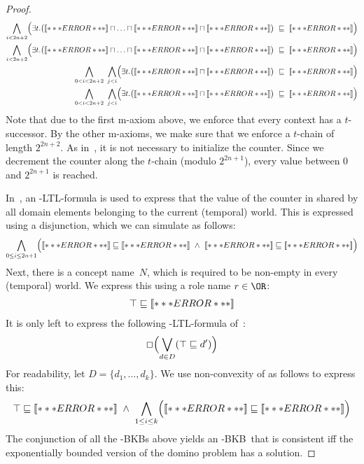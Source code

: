 \begin{proof}
  \begin{align*}
    \bigwedge_{i<2n+2} \Bigl( \exists t.\bigl(\oax{Z_{0}(a)} \sqcap\ldots\sqcap \oax{Z_{i-1}(a)} \sqcap \oax{Z_{i}(a)}\bigr)
    & \ \sqsubseteq\ \oax{(\lnot Z_{i})(a)}\Bigr)\\ 
    \bigwedge_{i<2n+2}\Bigl( \exists t.\bigl(\oax{Z_{0}(a)}\sqcap\ldots\sqcap \oax{Z_{i-1}(a)} \sqcap \oax{(\lnot Z_{i})(a)}\bigr)
    & \ \sqsubseteq\ \oax{Z_{i}(a)}\Bigr)\\
    \bigwedge_{0<i<2n+2}\ \bigwedge_{j<i}\Bigl(\exists t.\bigl(\oax{(\lnot Z_{j})(a)}\sqcap\oax{Z_{i}(a)}\bigr)
    & \ \sqsubseteq\ \oax{Z_{i}(a)}\Bigr)\\
    \bigwedge_{0<i<2n+2}\ \bigwedge_{j<i}\Bigl(\exists t.\bigl(\oax{(\lnot Z_{j})(a)}\sqcap\oax{(\lnot Z_{i})(a)}\bigr)
    & \ \sqsubseteq\ \oax{(\lnot Z_{i})(a)}\Bigr)
  \end{align*}
  Note that due to the first m-axiom above, we enforce that every context has a $t$-successor.  By
  the other m-axioms, we make sure that we enforce a $t$-chain of length $2^{2n+2}$.
  As in~\cite{BaGL-KR08,BaGL-ToCL12}, it is not necessary to initialize the counter.  Since we
  decrement the counter along the $t$-chain (modulo $2^{2n+1}$), every value between $0$ and
  $2^{2n+1}$ is reached.

  In~\cite{BaGL-KR08,BaGL-ToCL12}, an \ALC-LTL-formula is used to express that the value of the
  counter in shared by all domain elements belonging to the current (temporal) world.  This is
  expressed using a disjunction, which we can simulate as follows:
  \begin{gather*}
    \bigwedge_{0\le i\le 2n+1} \Bigl(\oax{Z_i(a)}\sqsubseteq\oax{\top\sqsubseteq Z_i}\ \land\
    \oax{(\lnot Z_i)(a)}\sqsubseteq\oax{Z_i\sqsubseteq\bot}\Bigr)
  \end{gather*}
  Next, there is a concept name~$N$, which is required to be non-empty in every (temporal) world.  We
  express this using a role name $r\in\OR$:
  \begin{gather*}
    \top\sqsubseteq\oax{(\exists r.N)(a)}
  \end{gather*}
  It is only left to express the following \ALC-LTL-formula of~\cite{BaGL-KR08,BaGL-ToCL12}:
  \begin{gather*}
    \Box\Bigl(\bigvee_{d\in D} (\top\sqsubseteq d')\Bigr)
  \end{gather*}
  For readability, let $D=\{d_1,\dots,d_k\}$.  We use non-convexity of \ALC as follows to express
  this:
  \begin{gather*}
    \top\sqsubseteq\oax{(d_1'\sqcup\dots\sqcup d_k')(a)}\ \land\ \bigwedge_{1\le i\le k}
    \Bigl(\oax{d_i'(a)}\sqsubseteq\oax{\top\sqsubseteq d_i'}\Bigr)
  \end{gather*}
  The conjunction of all the \ELALC-BKBs above yields an \ELALC-BKB~\B that is consistent iff the
  exponentially bounded version of the domino problem has a solution.
\end{proof}


